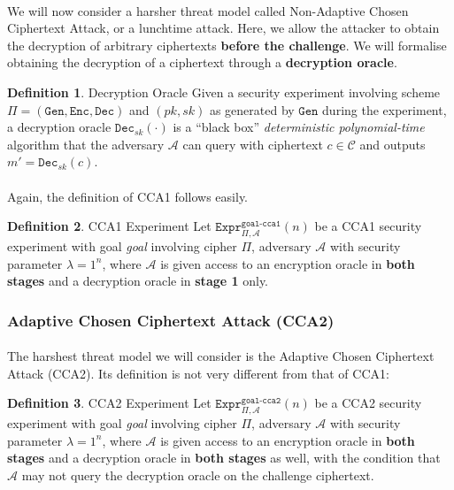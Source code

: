 \documentclass{article}
\theoremstyle{definition}
\newtheorem{definition}{Definition}[section]
\newcommand{\Enc}{\texttt{Enc}}
\newcommand{\Dec}{\texttt{Dec}}
\newcommand{\Gen}{\texttt{Gen}}
\renewcommand{\C}{\mathcal{C}}
\newcommand{\A}{\mathcal{A}}
\newcommand{\Expr}[2]{\texttt{Expr}^{\texttt{#1}}_{#2}}
\begin{document}
\paragraph{} We will now consider a harsher threat model called Non-Adaptive
Chosen Ciphertext Attack, or a lunchtime attack. Here, we allow the attacker to
obtain the decryption of arbitrary ciphertexts \textbf{before the challenge}.
We will formalise obtaining the decryption of a ciphertext through a
\textbf{decryption oracle}.
\begin{definition}{Decryption Oracle}
  Given a security experiment involving scheme $\Pi = (\Gen, \Enc, \Dec)$ and
  $(pk, sk)$ as generated by $\Gen$ during the experiment, a decryption oracle
  $\Dec_{sk}(\cdot)$ is a ``black box'' \textit{deterministic polynomial-time}
  algorithm that the adversary $\A$ can query with ciphertext $c\in \C$ and
  outputs $m' = \Dec_{sk}(c)$.
\end{definition}
\paragraph{} Again, the definition of CCA1 follows easily.
\begin{definition}{CCA1 Experiment}
  Let $\Expr{goal-cca1}{\Pi, \A}(n)$ be a CCA1 security experiment with goal
  \textit{goal} involving
  cipher $\Pi$, adversary $\A$ with security parameter $\lambda = 1^n$, where
  $\A$ is given access to an encryption oracle in \textbf{both stages} and a
  decryption oracle in \textbf{stage 1} only.
\end{definition}
\subsubsection{Adaptive Chosen Ciphertext Attack (CCA2)}
\paragraph{} The harshest threat model we will consider is the Adaptive Chosen
Ciphertext Attack (CCA2). Its definition is not very different from that of CCA1:
\begin{definition}{CCA2 Experiment}
  Let $\Expr{goal-cca2}{\Pi, \A}(n)$ be a CCA2 security experiment with goal
  \textit{goal} involving
  cipher $\Pi$, adversary $\A$ with security parameter $\lambda = 1^n$, where
  $\A$ is given access to an encryption oracle in \textbf{both stages} and a
  decryption oracle in \textbf{both stages} as well, with the condition that
  $\A$ may not query the decryption oracle on the challenge ciphertext.
\end{definition}
\end{document}
